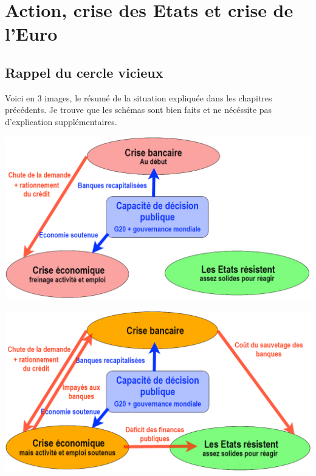 
\chapter{Action, crise des Etats et crise de l'Euro}
\section{Rappel du cercle vicieux}
Voici en 3 images, le résumé de la situation expliquée dans les chapitres précédents. Je trouve que les schémas sont bien faits et ne nécéssite pas d'explication supplémentaires.\\
 
\begin{minipage}{0.5\textwidth}
	\begin{flushleft}
		\includegraphics[scale=0.26]{27}
	\end{flushleft}
\end{minipage}
\begin{minipage}{0.5\textwidth}
	\begin{center}
		\includegraphics[scale=0.26]{28}
	\end{center}
\end{minipage}
